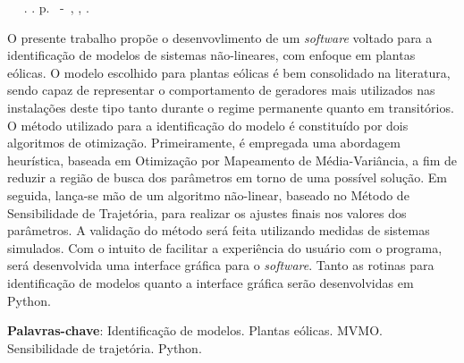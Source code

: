 \setlength{\absparsep}{18pt} %
\begin{resumo}
	\begin{flushleft} 
			\setlength{\absparsep}{0pt} %
			\SingleSpacing 
			\imprimirautorabr~ ~\textbf{\imprimirtitulo}.	\imprimirdata. \pageref{LastPage}p. 
			\imprimirtipotrabalho~-~\imprimirinstituicao, \imprimirlocal, \imprimirdata. 
 	\end{flushleft}
\OnehalfSpacing 			
O presente trabalho prop\~oe o desenvovlimento de um \textit{software} voltado para a identifica\c{c}\~ao de modelos de sistemas n\~ao-lineares, com enfoque em plantas e\'olicas. O modelo escolhido para plantas e\'olicas \'e bem consolidado na literatura, sendo capaz de representar o comportamento de geradores mais utilizados nas instala\c{c}\~oes deste tipo tanto durante o regime permanente quanto em transit\'orios. O m\'etodo utilizado para a identifica\c{c}\~ao do modelo \'e constitu\'ido por dois algoritmos de otimiza\c{c}\~ao. Primeiramente, \'e empregada uma abordagem heur\'istica, baseada em Otimiza\c{c}\~ao por Mapeamento de M\'edia-Vari\^ancia, a fim de reduzir a regi\~ao de busca dos par\^ametros em torno de uma poss\'ivel solu\c{c}\~ao. Em seguida, lan\c{c}a-se m\~ao de um algoritmo n\~ao-linear, baseado no M\'etodo de Sensibilidade de Trajet\'oria, para realizar os ajustes finais nos valores dos par\^ametros. A valida\c{c}\~ao do m\'etodo ser\'a feita utilizando medidas de sistemas simulados. Com o intuito de facilitar a experi\^encia do usu\'ario com o programa, ser\'a desenvolvida uma interface gr\'afica para o \textit{software}. Tanto as rotinas para identifica\c{c}\~ao de modelos quanto a interface gr\'afica ser\~ao desenvolvidas em Python.
 

 \textbf{Palavras-chave}: Identifica\c{c}\~ao de modelos. Plantas e\'olicas. MVMO. Sensibilidade de trajet\'oria. Python.
\end{resumo}